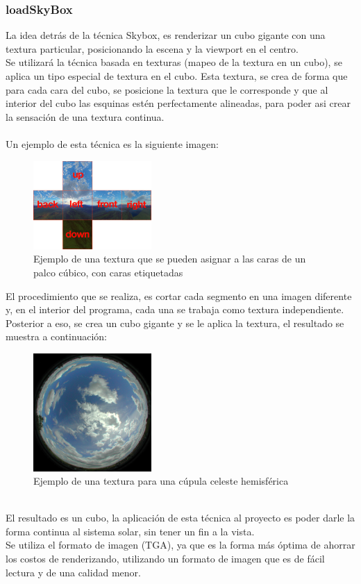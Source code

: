 \documentclass[12pt,journal,compsoc]{IEEEtran}
\begin{document}
\subsubsection{loadSkyBox}
La idea detrás de la técnica Skybox, es renderizar un cubo gigante con una textura particular, posicionando la escena y la viewport en el centro\cite{skybox}.\\
Se utilizará la técnica basada en texturas (mapeo de la textura en un cubo), se aplica un tipo especial de textura en el cubo. Esta textura, se crea de forma que para cada cara del cubo, se posicione la textura que le corresponde y que al interior del cubo las esquinas estén perfectamente alineadas, para poder asi crear la sensación de una textura continua.\\
\\
Un ejemplo de esta técnica es la siguiente imagen:
%

\begin{figure}[h!]
	\includegraphics[width=0.4\textwidth, height=0.25\textwidth]{Skybox1.png}
	\centering
	\caption{Ejemplo de una textura que se pueden asignar a las caras de un palco cúbico, con caras etiquetadas}
\end{figure}
%
El procedimiento que se realiza, es cortar cada segmento en una imagen diferente y, en el interior del programa, cada una se trabaja como textura independiente. Posterior a eso, se crea un cubo gigante y se le aplica la textura, el resultado se muestra a continuación:\\
%
\begin{figure}[h!]
	\includegraphics[width=0.4\textwidth, height=0.25\textwidth]{Skybox2.png}
	\centering
	\caption{Ejemplo de una textura para una cúpula celeste hemisférica}
\end{figure}
%
\\
El resultado es un cubo, la aplicación de esta técnica al proyecto es poder darle la forma continua al sistema solar, sin tener un fin a la vista.\\
Se utiliza el formato de imagen (TGA), ya que es la forma más óptima de ahorrar los costos de renderizando\cite{foley}, utilizando un formato de imagen que es de fácil lectura y de una calidad menor.
%
\end{document}
